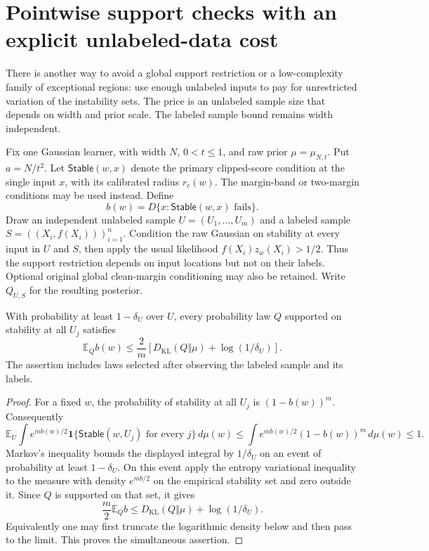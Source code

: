 \section{Pointwise support checks with an explicit unlabeled-data cost}
\label{sec:unlabeled-stability-pool}

There is another way to avoid a global support restriction or a
low-complexity family of exceptional regions: use enough unlabeled
inputs to pay for unrestricted variation of the instability sets.
The price is an unlabeled sample size that depends on width and prior
scale. The labeled sample bound remains width independent.

Fix one Gaussian learner, with width $N$, $0<t\le1$, and raw prior
$\mu=\mu_{N,t}$. Put $a=N/t^2$. Let $\mathsf{Stable}(w,x)$ denote
the primary clipped-score condition at the single input $x$, with
its calibrated radius $r_c(w)$. The margin-band or two-margin
conditions may be used instead. Define
\[
 b(w)=D\{x:\mathsf{Stable}(w,x)\text{ fails}\}.
\]
Draw an independent unlabeled sample $U=(U_1,\ldots,U_m)$ and a
labeled sample $S=((X_i,f(X_i)))_{i=1}^n$. Condition
the raw Gaussian on stability at every input in $U$ and $S$, then
apply the usual likelihood $f(X_i)z_w(X_i)>1/2$.
Thus the support restriction depends on input locations but not on
their labels. Optional original global clean-margin conditioning
may also be retained. Write $Q_{U,S}$ for the resulting posterior.

\begin{lemma}
\label{lem:unlabeled-stability-pacbayes}
With probability at least $1-\delta_U$ over $U$, every probability
law $Q$ supported on stability at all $U_j$ satisfies
\[
 \mathbb E_Q b(w)
 \le \frac{2}{m}\left[D_{\mathrm{KL}}(Q\Vert\mu)
                       +\log(1/\delta_U)\right].
\]
The assertion includes laws selected after observing the labeled
sample and its labels.
\end{lemma}

\begin{proof}
For a fixed $w$, the probability of stability at all $U_j$ is
$(1-b(w))^m$. Consequently
\[
 \mathbb E_U\int
 e^{m b(w)/2}\mathbf1\{\mathsf{Stable}(w,U_j)\text{ for every }j\}
 \,d\mu(w)
 \le\int e^{m b(w)/2}(1-b(w))^m\,d\mu(w)\le1.
\]
Markov's inequality bounds the displayed integral by $1/\delta_U$
on an event of probability at least $1-\delta_U$. On this event apply
the entropy variational inequality to the measure with density
$e^{m b/2}$ on the empirical stability set and zero outside it.
Since $Q$ is supported on that set, it gives
\[
 \frac m2\mathbb E_Qb
 \le D_{\mathrm{KL}}(Q\Vert\mu)+\log(1/\delta_U).
\]
Equivalently one may first truncate the logarithmic density below
and then pass to the limit. This proves the simultaneous assertion.
\end{proof}

